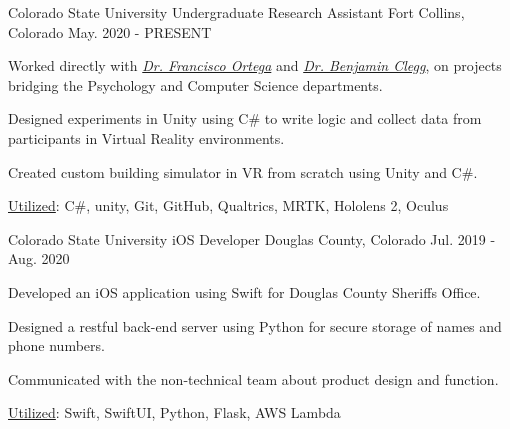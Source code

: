 

\begin{cventries}

  \cventry
    {Colorado State University} %
    {Undergraduate Research Assistant} %
    {Fort Collins, Colorado} %
    {May. 2020 - PRESENT} %
    {
      \begin{cvitems} %
        \item {Worked directly with \textit{\href{https://compsci.colostate.edu/person/?id=22550A7530193FD205613DD09DD2EE6F&sq=t}{Dr. Francisco Ortega}} and \textit{\href{http://psywebserv.psych.colostate.edu/psylist/detail.asp?Num=15}{Dr. Benjamin Clegg}}, on projects bridging the Psychology and Computer Science departments.}
        \item {Designed experiments in Unity using C\# to write logic and collect data from participants  in Virtual Reality environments.}
        \item {Created custom building simulator in VR from scratch using Unity and C\#.}
        \item {\underline{Utilized}:  C\#, unity,  Git,  GitHub,  Qualtrics, MRTK, Hololens 2, Oculus}
      \end{cvitems}
    }

  \cventry
    {Colorado State University} %
    {iOS Developer} %
    {Douglas County, Colorado} %
    {Jul. 2019 - Aug. 2020} %
    {
      \begin{cvitems} %
        \item {Developed an iOS  application using Swift for Douglas County Sheriffs Office.}
        \item {Designed a restful  back-end server using Python for secure storage of names and phone numbers.}
        \item {Communicated with the non-technical team about product design and function.}
        \item {\underline{Utilized}:  Swift, SwiftUI,  Python, Flask, AWS Lambda}
      \end{cvitems}
    }


\end{cventries}
